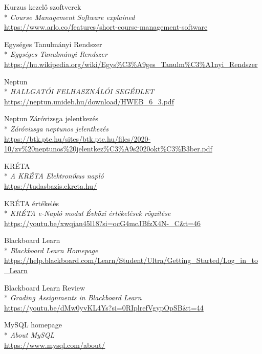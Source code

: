 \begin{thebibliography}{x}



 Kurzus kezelő szoftverek\\*
\textit{Course Management Software explained}
\\ \url{https://www.arlo.co/features/short-course-management-software}

 Egységes Tanulmányi Rendszer\\*
\textit{Egységes Tanulmányi Rendszer}
\\ \url{https://hu.wikipedia.org/wiki/Egys%C3%A9ges_Tanulm%C3%A1nyi_Rendszer}

 Neptun\\*
\textit{HALLGATÓI FELHASZNÁLÓI SEGÉDLET}
\\ \url{https://neptun.unideb.hu/download/HWEB_6_3.pdf}

 Neptun Záróvizsga jelentkezés\\*
\textit{Záróvizsga neptunos jelentkezés}
\\ \url{https://btk.pte.hu/sites/btk.pte.hu/files/2020-10/zv%20neptunos%20jelentkez%C3%A9s2020okt%C3%B3ber.pdf}

 KRÉTA\\*
\textit{A KRÉTA Elektronikus napló}
\\ \url{https://tudasbazis.ekreta.hu/}

 KRÉTA értékelés\\*
\textit{KRÉTA e-Napló modul Évközi értékelések rögzítése}
\\ \url{https://youtu.be/xwqjan45l18?si=ocG4mcJBfzX4N-_C&t=46}

 Blackboard Learn\\*
\textit{Blackboard Learn Homepage}
\\ \url{https://help.blackboard.com/Learn/Student/Ultra/Getting_Started/Log_in_to_Learn}

 Blackboard Learn Review\\*
\textit{Grading Assignments in Blackboard Learn}
\\ \url{https://youtu.be/dMw0yvKL4Ys?si=0RIplrefVgypOpSB&t=44}

 MySQL homepage\\*
\textit{About MySQL}
\\ \url{https://www.mysql.com/about/}


\end{thebibliography}
